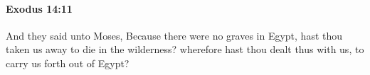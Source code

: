 
		\paragraph{Exodus 14:11} %
			\label{EXODUS-14-11}

			And they said unto Moses, Because there were no graves in Egypt, hast thou taken us away to die in the wilderness? wherefore hast thou dealt thus with us, to carry us forth out of Egypt?


